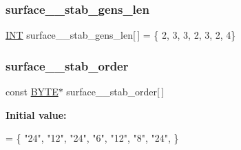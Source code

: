 \subsubsection{\texorpdfstring{surface\+\_\+\_\+stab\+\_\+gens\+\_\+len}{surface\_17\_stab\_gens\_len}}
{\footnotesize\ttfamily \mbox{\hyperlink{galois_8h_a09fddde158a3a20bd2dcadb609de11dc}{I\+NT}} surface\+\_\+\_\+stab\+\_\+gens\+\_\+len\mbox{[}$\,$\mbox{]} = \{ 2, 3, 3, 2, 3, 2, 4\}}

\mbox{\label{surface__17_8_c_aad762a13f2c7bcf8d1aae30c9306f097}} 
\subsubsection{\texorpdfstring{surface\+\_\+\_\+stab\+\_\+order}{surface\_17\_stab\_order}}
{\footnotesize\ttfamily const \mbox{\hyperlink{galois_8h_ab6cc7b4aeb6ea31aba2b3fbfc83ff5e6}{B\+Y\+TE}}$\ast$ surface\+\_\+\_\+stab\+\_\+order\mbox{[}$\,$\mbox{]}}

{\bfseries Initial value\+:}
\begin{DoxyCode}
= \{
    \textcolor{stringliteral}{"24"},
    \textcolor{stringliteral}{"12"},
    \textcolor{stringliteral}{"24"},
    \textcolor{stringliteral}{"6"},
    \textcolor{stringliteral}{"12"},
    \textcolor{stringliteral}{"8"},
    \textcolor{stringliteral}{"24"},
\}
\end{DoxyCode}
